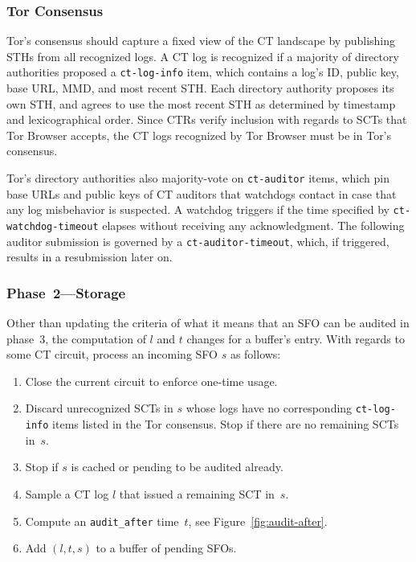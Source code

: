 \subsubsection{Tor Consensus} \label{sec:auditor:design:consensus}
Tor's consensus should capture a fixed view of the CT landscape by publishing
STHs from all recognized logs.  A CT log is recognized if a majority of directory
authorities proposed a \texttt{ct-log-info} item, which contains a log's ID,
public key, base URL, MMD, and most recent STH.  Each directory authority
proposes its own STH, and agrees to use the most recent STH as determined by
timestamp and lexicographical order.  Since CTRs verify inclusion with regards
to SCTs that Tor Browser accepts, the CT logs recognized by Tor Browser must be
in Tor's consensus.

Tor's directory authorities also majority-vote on \texttt{ct-auditor} items,
which pin base URLs and public keys of CT auditors that watchdogs contact in
case that any log misbehavior is suspected.  A watchdog triggers if the time
specified by \texttt{ct-watchdog-timeout} elapses without receiving any
acknowledgment.  The following auditor submission is governed by a
\texttt{ct-auditor-timeout}, which, if triggered, results in a resubmission
later on.

\subsubsection{Phase~2---Storage} \label{sec:auditor:design:phase2}
Other than updating the criteria of what it means that an SFO can be audited
in phase~3, the computation of $l$ and $t$ changes for a buffer's entry.  With
regards to some CT circuit, process an incoming SFO $s$ as follows:
\begin{enumerate}
	\item\label{enm:ext:storage:close} Close the current circuit to enforce
		one-time usage.
	\item\label{enm:ext:storage:unrecognized} Discard unrecognized SCTs in $s$
		whose logs have no corresponding \texttt{ct-log-info} items listed in
		the Tor consensus.  Stop if there are no remaining SCTs in~$s$.
	\item\label{enm:ext:storage:cached}
		Stop if $s$ is cached or pending to be audited already.
	\item\label{enm:ext:storage:fix-log} Sample a CT log $l$ that issued a
		remaining SCT in~$s$.
	\item\label{enm:storage:audit-after} Compute an \texttt{audit\_after}
		time~$t$, see Figure~\ref{fig:audit-after}.
	\item\label{enm:storage:store} Add $(l,t,s)$ to a buffer of pending SFOs.
\end{enumerate}


